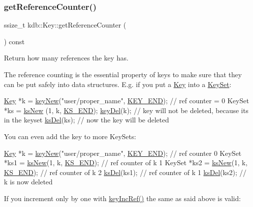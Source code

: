 \subsubsection{\texorpdfstring{get\+Reference\+Counter()}{getReferenceCounter()}}
{\footnotesize\ttfamily ssize\+\_\+t kdb\+::\+Key\+::get\+Reference\+Counter (\begin{DoxyParamCaption}{ }\end{DoxyParamCaption}) const\hspace{0.3cm}{\ttfamily [inline]}}



Return how many references the key has. 

The reference counting is the essential property of keys to make sure that they can be put safely into data structures. E.\+g. if you put a \hyperlink{classkdb_1_1Key}{Key} into a \hyperlink{classkdb_1_1KeySet}{Key\+Set}\+:


\begin{DoxyCodeInclude}
\hyperlink{classkdb_1_1Key_a5679f5cae63caddd64a60388b9cc77fa}{Key} *k = \hyperlink{group__key_gad23c65b44bf48d773759e1f9a4d43b89}{keyNew}(\textcolor{stringliteral}{"user/proper\_name"}, \hyperlink{group__key_gga91fb3178848bd682000958089abbaf40aa8adb6fcb92dec58fb19410eacfdd403}{KEY\_END}); \textcolor{comment}{// ref counter = 0}
KeySet *ks = \hyperlink{group__keyset_ga671e1aaee3ae9dc13b4834a4ddbd2c3c}{ksNew} (1, k, \hyperlink{kdbenum_8c_a7a28fce3773b2c873c94ac80b8b4cd54}{KS\_END});
\hyperlink{group__key_ga3df95bbc2494e3e6703ece5639be5bb1}{keyDel}(k); \textcolor{comment}{// key will not be deleted, because its in the keyset}
\hyperlink{group__keyset_ga27e5c16473b02a422238c8d970db7ac8}{ksDel}(ks); \textcolor{comment}{// now the key will be deleted}
\end{DoxyCodeInclude}
 You can even add the key to more Key\+Sets\+:


\begin{DoxyCodeInclude}
\hyperlink{classkdb_1_1Key_a5679f5cae63caddd64a60388b9cc77fa}{Key} *k = \hyperlink{group__key_gad23c65b44bf48d773759e1f9a4d43b89}{keyNew}(\textcolor{stringliteral}{"user/proper\_name"}, \hyperlink{group__key_gga91fb3178848bd682000958089abbaf40aa8adb6fcb92dec58fb19410eacfdd403}{KEY\_END}); \textcolor{comment}{// ref counter 0}
KeySet *ks1 = \hyperlink{group__keyset_ga671e1aaee3ae9dc13b4834a4ddbd2c3c}{ksNew}(1, k, \hyperlink{kdbenum_8c_a7a28fce3773b2c873c94ac80b8b4cd54}{KS\_END}); \textcolor{comment}{// ref counter of k 1}
KeySet *ks2 = \hyperlink{group__keyset_ga671e1aaee3ae9dc13b4834a4ddbd2c3c}{ksNew}(1, k, \hyperlink{kdbenum_8c_a7a28fce3773b2c873c94ac80b8b4cd54}{KS\_END}); \textcolor{comment}{// ref counter of k 2}
\hyperlink{group__keyset_ga27e5c16473b02a422238c8d970db7ac8}{ksDel}(ks1); \textcolor{comment}{// ref counter of k 1}
\hyperlink{group__keyset_ga27e5c16473b02a422238c8d970db7ac8}{ksDel}(ks2); \textcolor{comment}{// k is now deleted}
\end{DoxyCodeInclude}
 If you increment only by one with \hyperlink{group__key_ga6970a6f254d67af7e39f8e469bb162f1}{key\+Inc\+Ref()} the same as said above is valid\+:


